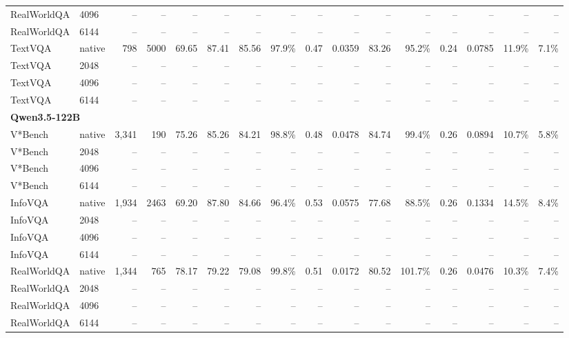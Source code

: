 \begin{table}[t]
\begin{tabular}{llrrrrrrrrrrrrrr}
RealWorldQA & 4096 & -- & -- & -- & -- & -- & -- & -- & -- & -- & -- & -- & -- & -- & -- \\
RealWorldQA & 6144 & -- & -- & -- & -- & -- & -- & -- & -- & -- & -- & -- & -- & -- & -- \\
TextVQA & native & 798 & 5000 & 69.65 & 87.41 & 85.56 & 97.9\% & 0.47 & 0.0359 & 83.26 & 95.2\% & 0.24 & 0.0785 & 11.9\% & 7.1\% \\
TextVQA & 2048 & -- & -- & -- & -- & -- & -- & -- & -- & -- & -- & -- & -- & -- & -- \\
TextVQA & 4096 & -- & -- & -- & -- & -- & -- & -- & -- & -- & -- & -- & -- & -- & -- \\
TextVQA & 6144 & -- & -- & -- & -- & -- & -- & -- & -- & -- & -- & -- & -- & -- & -- \\
\midrule
\multicolumn{10}{l}{\textbf{Qwen3.5-122B}} \\
V*Bench & native & 3,341 & 190 & 75.26 & 85.26 & 84.21 & 98.8\% & 0.48 & 0.0478 & 84.74 & 99.4\% & 0.26 & 0.0894 & 10.7\% & 5.8\% \\
V*Bench & 2048 & -- & -- & -- & -- & -- & -- & -- & -- & -- & -- & -- & -- & -- & -- \\
V*Bench & 4096 & -- & -- & -- & -- & -- & -- & -- & -- & -- & -- & -- & -- & -- & -- \\
V*Bench & 6144 & -- & -- & -- & -- & -- & -- & -- & -- & -- & -- & -- & -- & -- & -- \\
InfoVQA & native & 1,934 & 2463 & 69.20 & 87.80 & 84.66 & 96.4\% & 0.53 & 0.0575 & 77.68 & 88.5\% & 0.26 & 0.1334 & 14.5\% & 8.4\% \\
InfoVQA & 2048 & -- & -- & -- & -- & -- & -- & -- & -- & -- & -- & -- & -- & -- & -- \\
InfoVQA & 4096 & -- & -- & -- & -- & -- & -- & -- & -- & -- & -- & -- & -- & -- & -- \\
InfoVQA & 6144 & -- & -- & -- & -- & -- & -- & -- & -- & -- & -- & -- & -- & -- & -- \\
RealWorldQA & native & 1,344 & 765 & 78.17 & 79.22 & 79.08 & 99.8\% & 0.51 & 0.0172 & 80.52 & 101.7\% & 0.26 & 0.0476 & 10.3\% & 7.4\% \\
RealWorldQA & 2048 & -- & -- & -- & -- & -- & -- & -- & -- & -- & -- & -- & -- & -- & -- \\
RealWorldQA & 4096 & -- & -- & -- & -- & -- & -- & -- & -- & -- & -- & -- & -- & -- & -- \\
RealWorldQA & 6144 & -- & -- & -- & -- & -- & -- & -- & -- & -- & -- & -- & -- & -- & -- \\

\end{tabular}
\end{table}
